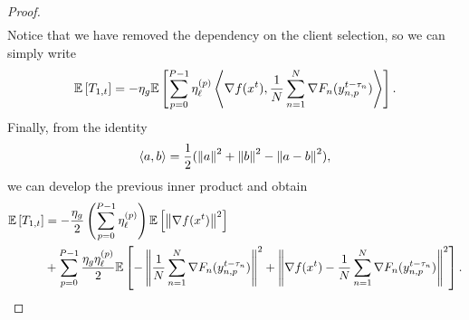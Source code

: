 \begin{proof}
\begin{equation}
\begin{aligned}
        \end{aligned}
    \end{equation}
    Notice that we have removed the dependency on the client selection, so we can simply write
    \begin{equation}
        \mathbb{E}\left[T_{1,t}\right] = - \eta_g \mathbb{E}\left[\sum_{p=0}^{P-1} \eta^{(p)}_{\ell}  \left\langle \nabla f(x^t), \frac{1}{N}\sum_{n = 1}^N \nabla F_n(y^{t-\tau_n}_{n,p}) \right\rangle\right].
    \end{equation}
    Finally, from the identity
    \begin{equation*}
        \langle a, b \rangle = \frac{1}{2}(\left\lVert a\right\rVert^2 + \left\lVert b\right\rVert^2 - \left\lVert a-b\right\rVert^2),
    \end{equation*}
    we can develop the previous inner product and obtain
    \begin{equation}
        \begin{aligned}
            \mathbb{E}\left[T_{1,t}\right]
             & = -\frac{\eta_g}{2} \left(\sum_{p=0}^{P-1} \eta^{(p)}_{\ell} \right)\mathbb{E}\left[\left\lVert\nabla f(x^t)\right\rVert^2\right]                                                                                                                      \\
             & + \sum_{p=0}^{P-1} \frac{ \eta_g \eta^{(p)}_{\ell}}{2} \mathbb{E}\left[- \left\lVert\frac{1}{N}\sum_{n = 1}^N \nabla F_n(y^{t-\tau_n}_{n,p})\right\rVert^2 + \left\lVert\nabla f(x^t) - \frac{1}{N}\sum_{n = 1}^N \nabla F_n(y^{t-\tau_n}_{n,p})\right\rVert^2\right].
        \end{aligned}
    \end{equation}
\end{proof}

